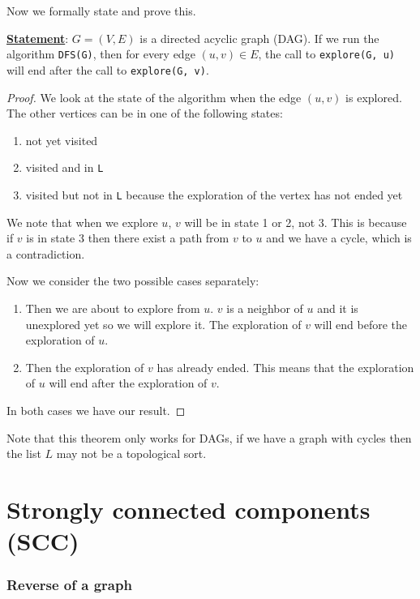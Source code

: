 \documentclass[12pt]{extarticle}
\begin{document}
Now we formally state and prove this.

\textbf{\underline{Statement}}: $G=(V, E)$ is a directed acyclic graph (DAG). If we run the algorithm \texttt{DFS(G)}, then for every edge $(u, v) \in E$, the call to \texttt{explore(G, u)} will end after the call to \texttt{explore(G, v)}.

\begin{proof}
    We look at the state of the algorithm when the edge $(u, v)$ is explored.
    The other vertices can be in one of the following states:
    \begin{enumerate}
        \item not yet visited
        \item visited and in \texttt{L}
        \item visited but not in \texttt{L} because the exploration of the vertex has not ended yet
    \end{enumerate}

    We note that when we explore $u$, $v$ will be in state 1 or 2, not 3.
    This is because if $v$ is in state 3 then there exist a path from $v$ to $u$ and we have a cycle, which is a contradiction.

    Now we consider the two possible cases separately:
    \begin{enumerate}
        \item Then we are about to explore from $u$. $v$ is a neighbor of $u$ and it is unexplored yet so we will explore it.
              The exploration of $v$ will end before the exploration of $u$.
        \item Then the exploration of $v$ has already ended. This means that the exploration of $u$ will end after the exploration of $v$.
    \end{enumerate}

    In both cases we have our result.
\end{proof}

Note that this theorem only works for DAGs, if we have a graph with cycles then the list $L$ may not be a topological sort.

\section{Strongly connected components (SCC)}

\subsubsection{Reverse of a graph}
\end{document}
